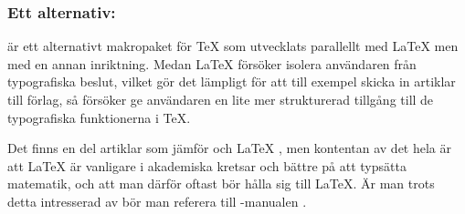 \documentclass[../../latex.tex]{subfiles}
\begin{document}
\subsubsection{Ett alternativ: }
 är ett alternativt makropaket för \TeX{} som utvecklats
parallellt med \LaTeX{} men med en annan inriktning. Medan \LaTeX{}
försöker isolera användaren från typografiska beslut, vilket gör det
lämpligt för att till exempel skicka in artiklar till förlag, så
försöker  ge användaren en lite mer strukturerad tillgång
till de typografiska funktionerna i \TeX.

Det finns en del artiklar som jämför  och \LaTeX{}
, men kontentan av det hela är att
\LaTeX{} är vanligare i akademiska kretsar och bättre på att typsätta
matematik, och att man därför oftast bör hålla sig till \LaTeX. Är man
trots detta intresserad av  bör man referera till
-manualen \cite{Hagen01}.



\begin{english}
	\renewcommand\refname{Referenser}
	\let\oldurl=\url\renewcommand\url[1]{\newline{\small\oldurl{#1}}}
	\cleardoublepage
	
\end{english}
\end{document}
